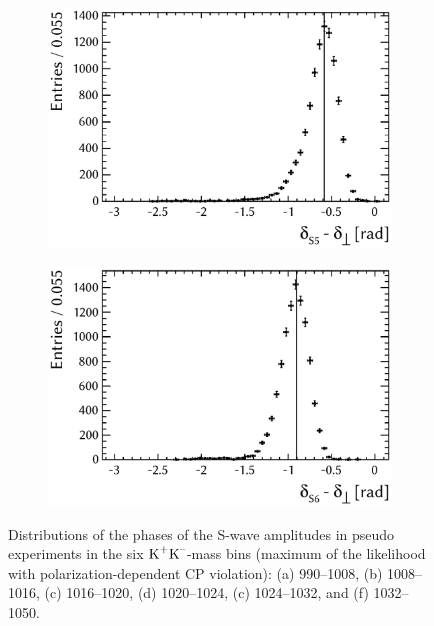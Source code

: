 \begin{figure}[tbp]
  \vspace*{0.02\textwidth}
  \begin{subfigure}{0.49\textwidth}
    \includegraphics[width=\textwidth]{graphics/results/parDist_polarDep_ASOddPhase_bin4}
    \caption{}
  \end{subfigure}
  \hfill%
  \begin{subfigure}{0.49\textwidth}
    \includegraphics[width=\textwidth]{graphics/results/parDist_polarDep_ASOddPhase_bin5}
    \caption{}
  \end{subfigure}

  \caption{Distributions of the phases of the S-wave amplitudes in pseudo experiments in the six $\text{K}^\text{+}\text{K}^\text{--}$-mass bins
           (maximum of the likelihood with polarization-dependent CP violation):
           (a) 990--1008\unitsp\MeV, (b) 1008--1016\unitsp\MeV, (c) 1016--1020\unitsp\MeV,
           (d) 1020--1024\unitsp\MeV, (c) 1024--1032\unitsp\MeV, and (f) 1032--1050\unitsp\MeV.}
  \label{fig:parDists_SWavePhases}
\end{figure}

